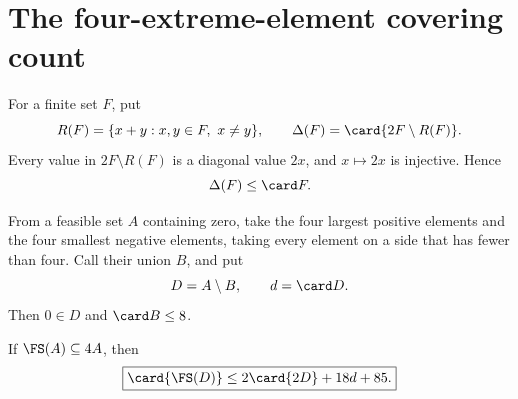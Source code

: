 
\section{The four-extreme-element covering count}\label{sec:cover}

For a finite set $F$, put
\[
 R(F)=\{x+y:x,y\in F,\ x\ne y\},
 \qquad \Delta(F)=\card{2F\setminus R(F)}.
\]
Every value in $2F\setminus R(F)$ is a diagonal value $2x$, and
$x\mapsto2x$ is injective.  Hence
\begin{equation}
 \Delta(F)\leq\card F.
 \label{eq:delta-trivial}
\end{equation}

From a feasible set $A$ containing zero, take the four largest positive
elements and the four smallest negative elements, taking every element on a
side that has fewer than four.  Call their union $B$, and put
\[
 D=A\setminus B,\qquad d=\card D.
\]
Then $0\in D$ and $\card B\leq8$.

\begin{lemma}\label{lem:cover-count}
If $\FS(A)\subseteq4A$, then
\begin{equation}
 \boxed{\card{\FS(D)}\leq2\card{2D}+18d+85.}
 \label{eq:sharp-cover}
\end{equation}
\end{lemma}

